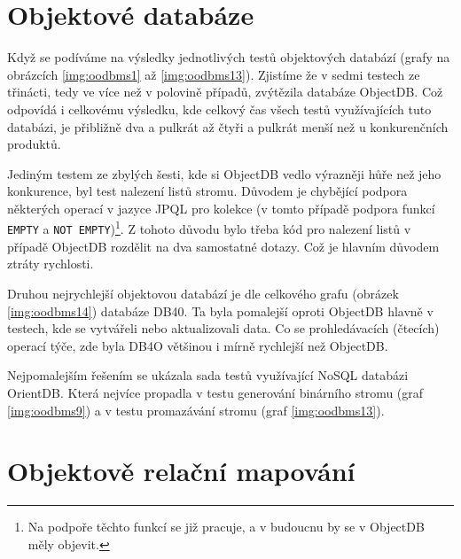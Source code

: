 \section{Objektové databáze}
Když se podíváme na výsledky jednotlivých testů objektových databází (grafy na obrázcích \ref{img:oodbms1} až \ref{img:oodbms13}). Zjistíme že v sedmi testech ze třinácti, tedy ve více než v polovině případů, zvýtězila databáze ObjectDB. Což odpovídá i celkovému výsledku, kde celkový čas všech testů využívajících tuto databázi, je přibližně dva a pulkrát až čtyři a pulkrát menší než u konkurenčních produktů.

Jediným testem ze zbylých šesti, kde si ObjectDB vedlo výrazněji hůře než jeho konkurence, byl test nalezení listů stromu. Důvodem je chybějící podpora některých operací v jazyce JPQL pro kolekce (v tomto případě podpora funkcí \texttt{EMPTY} a \texttt{NOT EMPTY})\footnote{Na podpoře těchto funkcí se již pracuje, a v budoucnu by se v ObjectDB měly objevit.}. Z tohoto důvodu bylo třeba kód pro nalezení listů v případě ObjectDB rozdělit na dva samostatné dotazy. Což je hlavním důvodem ztráty rychlosti.

Druhou nejrychlejší objektovou databází je dle celkového grafu (obrázek \ref{img:oodbms14}) databáze DB40. Ta byla pomalejší oproti ObjectDB hlavně v testech, kde se vytvářeli nebo aktualizovali data. Co se prohledávacích (čtecích) operací týče, zde byla DB4O většinou i mírně rychlejší než ObjectDB.

Nejpomalejším řešením se ukázala sada testů využívající NoSQL databázi OrientDB. Která nejvíce propadla v testu generování binárního stromu (graf \ref{img:oodbms9}) a v testu promazávání stromu (graf \ref{img:oodbms13}).


\section{Objektově relační mapování}

